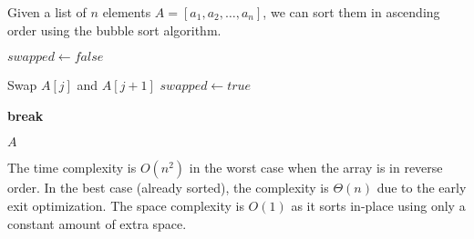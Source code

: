   \begin{algo}
    Given a list of $n$ elements $A = [a_1, a_2, \ldots, a_n]$, we can sort them in ascending order using the bubble sort algorithm.
    \begin{algorithmic}[1]
       
         
          \State $swapped \gets false$ 
          
           
             
              \State Swap $A[j]$ and $A[j+1]$ 
              \State $swapped \gets true$ 
            \EndIf
          \EndFor
          
           
            \State \textbf{break} 
          \EndIf
        \EndFor
        
        \State \Return $A$ 
      \EndProcedure
    \end{algorithmic}
    The time complexity is $O(n^2)$ in the worst case when the array is in reverse order. In the best case (already sorted), the complexity is $\Theta(n)$ due to the early exit optimization. The space complexity is $O(1)$ as it sorts in-place using only a constant amount of extra space.
  \end{algo}
  
